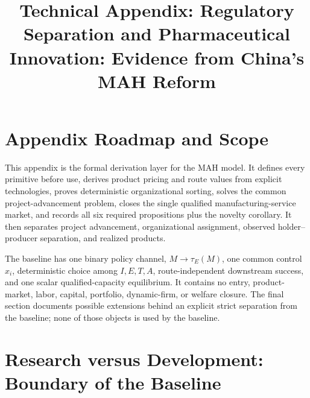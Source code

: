 \documentclass[11pt]{article}
\title{Technical Appendix: Regulatory Separation and Pharmaceutical Innovation: Evidence from China's MAH Reform}
\author{}
\date{}
\newcommand{\1}{\mathbf{1}}
\begin{document}
\maketitle
\thispagestyle{plain}
\renewcommand{\thepage}{A-\arabic{page}}

\newpage
\tableofcontents
\newpage
\small

\section{Appendix Roadmap and Scope}
\label{sec:appendix-roadmap}

This appendix is the formal derivation layer for the MAH model. It
defines every primitive before use, derives product pricing and route values
from explicit technologies, proves deterministic organizational sorting,
solves the common project-advancement problem, closes the single qualified
manufacturing-service market, and records all six required propositions plus
the novelty corollary. It then separates project advancement, organizational
assignment, observed holder--producer separation, and realized products.

The baseline has one binary policy channel, \(M\to\tau_E(M)\), one common
control \(x_i\), deterministic choice among \(I,E,T,A\), route-independent
downstream success, and one scalar qualified-capacity equilibrium. It contains
no entry, product-market, labor, capital, portfolio, dynamic-firm, or welfare
closure. The final section documents possible extensions behind an explicit
strict separation from the baseline; none of those objects is used by the baseline.












\section{Research versus Development: Boundary of the Baseline}
\label{sec:p16a-research-development-boundary}
\end{document}
